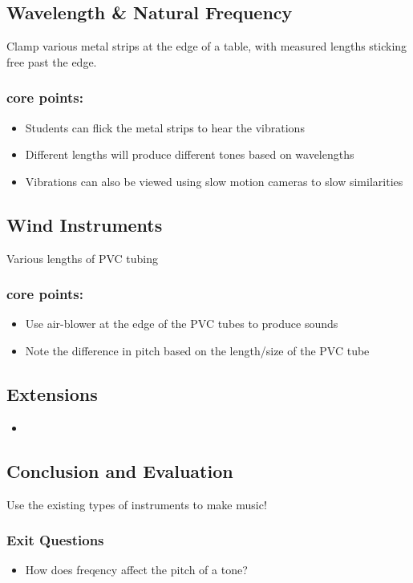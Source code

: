 \documentclass{lessonplan}
\begin{document}
    \subsection{Wavelength & Natural Frequency}

      Clamp various metal strips at the edge of a table, with measured lengths sticking free past the edge. 

      \subsubsection{core points:}
      \begin{itemize}
        \item Students can flick the metal strips to hear the vibrations
        \item Different lengths will produce different tones based on wavelengths
        \item Vibrations can also be viewed using slow motion cameras to slow similarities
      \end{itemize}

    \subsection{Wind Instruments}

      Various lengths of PVC tubing

      \subsubsection{core points:}
      \begin{itemize}
        \item Use air-blower at the edge of the PVC tubes to produce sounds
        \item Note the difference in pitch based on the length/size of the PVC tube
      \end{itemize}
    \subsection{Extensions}
      \begin{itemize}
        \item 
      \end{itemize}
    \subsection{Conclusion and Evaluation}
      Use the existing types of instruments to make music!
      \subsubsection{Exit Questions}
      \begin{itemize}
        \item How does freqency affect the pitch of a tone?
      \end{itemize}
\end{document}
